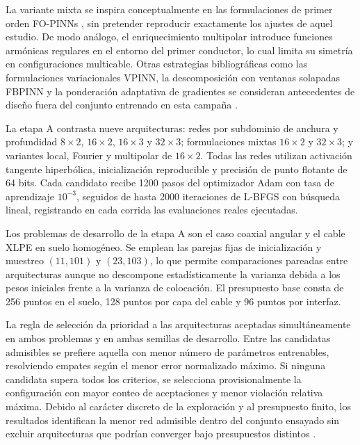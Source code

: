 La variante mixta se inspira conceptualmente en las formulaciones de primer orden FO-PINNs \parencite{gladstone2022fopinn}, sin pretender reproducir exactamente los ajustes de aquel estudio. De modo análogo, el enriquecimiento multipolar introduce funciones armónicas regulares en el entorno del primer conductor, lo cual limita su simetría en configuraciones multicable. Otras estrategias bibliográficas como las formulaciones variacionales VPINN, la descomposición con ventanas solapadas FBPINN y la ponderación adaptativa de gradientes se consideran antecedentes de diseño fuera del conjunto entrenado en esta campaña \parencites{kharazmi2020hpvpinn}{moseley2021fbpinn}{wang2020gradients}.

La etapa A contrasta nueve arquitecturas: redes por subdominio de anchura y profundidad $8\times2$, $16\times2$, $16\times3$ y $32\times3$; formulaciones mixtas $16\times2$ y $32\times3$; y variantes local, Fourier y multipolar de $16\times2$. Todas las redes utilizan activación tangente hiperbólica, inicialización reproducible y precisión de punto flotante de 64 bits. Cada candidato recibe 1200 pasos del optimizador Adam con tasa de aprendizaje $10^{-3}$, seguidos de hasta 2000 iteraciones de L-BFGS con búsqueda lineal, registrando en cada corrida las evaluaciones reales ejecutadas.

Los problemas de desarrollo de la etapa A son el caso coaxial angular y el cable XLPE en suelo homogéneo. Se emplean las parejas fijas de inicialización y muestreo $(11, 101)$ y $(23, 103)$, lo que permite comparaciones pareadas entre arquitecturas aunque no descompone estadísticamente la varianza debida a los pesos iniciales frente a la varianza de colocación. El presupuesto base consta de 256 puntos en el suelo, 128 puntos por capa del cable y 96 puntos por interfaz.

La regla de selección da prioridad a las arquitecturas aceptadas simultáneamente en ambos problemas y en ambas semillas de desarrollo. Entre las candidatas admisibles se prefiere aquella con menor número de parámetros entrenables, resolviendo empates según el menor error normalizado máximo. Si ninguna candidata supera todos los criterios, se selecciona provisionalmente la configuración con mayor conteo de aceptaciones y menor violación relativa máxima. Debido al carácter discreto de la exploración y al presupuesto finito, los resultados identifican la menor red admisible dentro del conjunto ensayado sin excluir arquitecturas que podrían converger bajo presupuestos distintos \parencite{bergstra2012random}.

